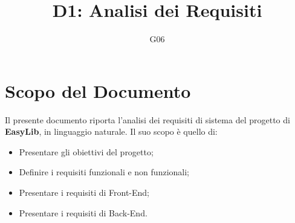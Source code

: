 \documentclass{article}
\title{D1: Analisi dei Requisiti}
\author{G06}
\begin{document}
\maketitle
\tableofcontents
\newpage



\section{Scopo del Documento}
Il presente documento riporta l’analisi dei requisiti di sistema del progetto di \textbf{EasyLib}, in linguaggio naturale.
Il suo scopo è quello di:
\begin{itemize}
    \item Presentare gli obiettivi del progetto;
    \item Definire i requisiti funzionali e non funzionali;
    \item Presentare i requisiti di Front-End;
    \item Presentare i requisiti di Back-End.
\end{itemize}
\end{document}

